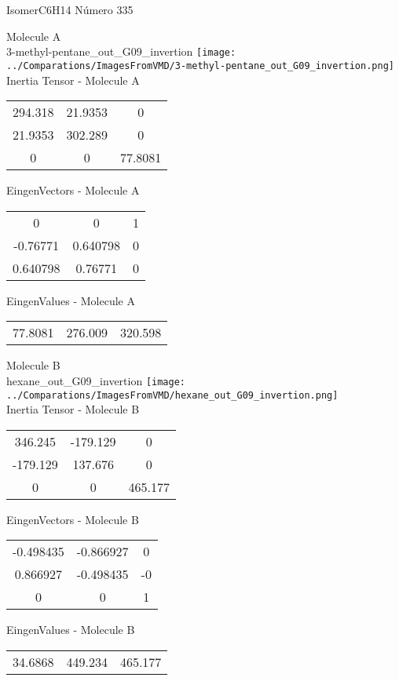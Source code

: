 \vtab[-2cm]
\begin{center}
{\large IsomerC6H14 \tab Número 335}
\end{center}
\begin{multicols}{2}
\begin{center}

Molecule A \\ 
3-methyl-pentane\_out\_G09\_invertion
\texttt{[image: ../Comparations/ImagesFromVMD/3-methyl-pentane\_out\_G09\_invertion.png]}
\\
Inertia Tensor - Molecule A \\
\vtab

\begin{tabular}{|c c c|}
294.318	 & 	21.9353	 & 	0	 \\
21.9353	 & 	302.289	 & 	0	 \\
0	 & 	0	 & 	77.8081
\end{tabular}

\vtab
 EingenVectors - Molecule A     \\
\vtab
\begin{tabular}{|c c c|}
0	 & 	0	 & 	1	 \\
-0.76771	 & 	0.640798	 & 	0	 \\
0.640798	 & 	0.76771	 & 	0
\end{tabular}

\vtab
 EingenValues - Molecule A     \\
\vtab
\begin{tabular}{|c c c|}
77.8081	 & 	276.009	 & 	320.598	 \\
\end{tabular}
\columnbreak

Molecule B \\ 
hexane\_out\_G09\_invertion
\texttt{[image: ../Comparations/ImagesFromVMD/hexane\_out\_G09\_invertion.png]}
\\
Inertia Tensor - Molecule B \\
\vtab

\begin{tabular}{|c c c|}
346.245	 & 	-179.129	 & 	0	 \\
-179.129	 & 	137.676	 & 	0	 \\
0	 & 	0	 & 	465.177
\end{tabular}

\vtab
 EingenVectors - Molecule B     \\
\vtab
\begin{tabular}{|c c c|}
-0.498435	 & 	-0.866927	 & 	0	 \\
0.866927	 & 	-0.498435	 & 	-0	 \\
0	 & 	0	 & 	1
\end{tabular}

\vtab
 EingenValues - Molecule B     \\
\vtab
\begin{tabular}{|c c c|}
34.6868	 & 	449.234	 & 	465.177	 \\
\end{tabular}

\end{center}
\end{multicols}
